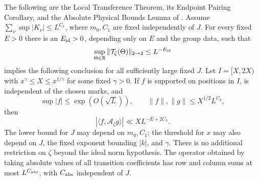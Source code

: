 \begin{proposition}\label{sh:transference}
The following are the Local Transference Theorem, its Endpoint Pairing
Corollary, and the Absolute Physical Bounds Lemma of
\cite[Section~3, Theorem~3.5, Corollary~3.11, and Lemma~3.4]{SmoothShifted}.
Assume $\sum_\nu\sup|K_\nu|\leq L^{C_1}$, where $m_0,C_1$ are
fixed independently of $J$.  For every fixed $E>0$ there is an
$E_{\rm id}>0$, depending only on $E$ and the group data, such that
\[
 \sup_{\Theta\in\mathbb R}
       \|\mathcal T_\zeta(\Theta)\|_{2\to2}\leq L^{-E_{\rm id}}
\]
implies the following conclusion for all sufficiently large fixed
$J$.  Let $I=[X,2X)$ with $x^\gamma\leq X\leq x^{1/\gamma}$ for
some fixed $\gamma>0$.  If $f$ is supported on positions in $I$,
is independent of the chosen marks, and
\[
 \sup|f|\leq\exp(O(\sqrt L)),\qquad
 \|f\|,\|g\|\leq X^{1/2}L^{C_3},
\]
then
\begin{equation}\label{sh:pairing}
 |\langle f,\mathcal A_\zeta g\rangle|
 \ll XL^{-E+2C_3}.
\end{equation}
The lower bound for $J$ may depend on $m_0,C_1$; the threshold for
$x$ may also depend on $J$, the fixed exponent bounding $|k|$, and
$\gamma$.  There is no additional restriction on $\zeta$ beyond the
ideal norm hypothesis.  The operator obtained by taking absolute
values of all transition coefficients has row and column sums at
most $L^{C_{\rm abs}}$, with $C_{\rm abs}$ independent of $J$.
\end{proposition}

